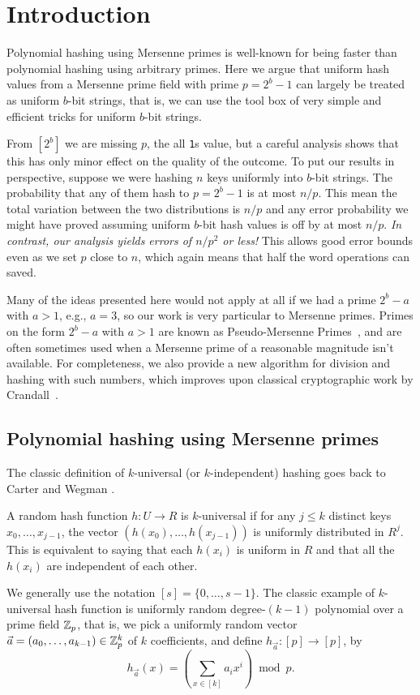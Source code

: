 \section{Introduction}
Polynomial hashing using Mersenne primes is well-known for being faster
than polynomial hashing using arbitrary primes. Here we argue that
uniform hash values from a Mersenne prime field with prime $p=2^b-1$
can largely be treated as uniform $b$-bit strings, that is, we can use
the tool box of very simple and efficient tricks for uniform
$b$-bit strings.

From $[2^b]$ we are missing $p$, the all \texttt1s value, but a careful analysis shows that this has only minor effect on the quality of the outcome.
To put our results in perspective, suppose we were hashing $n$ keys uniformly into $b$-bit strings.
The probability that any of them hash to $p=2^b-1$ is at most $n/p$.
This mean the total variation between the two distributions is $n/p$ and any error probability we might have proved assuming uniform $b$-bit hash values is off by at most $n/p$.
\emph{In contrast, our analysis yields errors of $n/p^2$ or less!}
This allows good error bounds even as we set $p$ close to $n$, which again means that half the word operations can saved.

Many of the ideas presented here would not apply at all if we had a prime $2^b-a$ with $a>1$, e.g., $a=3$, so our work is very particular to Mersenne primes.
Primes on the form $2^b-a$ with $a>1$ are known as Pseudo-Mersenne Primes~\cite{van2014encyclopedia}, and are often sometimes used when a Mersenne prime of a reasonable magnitude isn't available.
For completeness, we also provide a new algorithm for division and hashing with such numbers, which improves upon classical cryptographic work by Crandall~\cite{crandall1992method}.



\subsection{Polynomial hashing using Mersenne primes}
The classic definition of $k$-universal (or $k$-independent) hashing
goes back to Carter and Wegman \cite{wegman81kwise}.
\begin{definition}
   A random hash function $h:U\to R$ is $k$-universal if for any $j\leq k$
   distinct keys $x_0,\ldots,x_{j-1}$, the vector
   $(h(x_0),\ldots,h(x_{j-1}))$ is uniformly distributed in $R^j$. This
   is equivalent to saying that each $h(x_i)$ is uniform in $R$ and that
   all the $h(x_i)$ are independent of each other.
\end{definition}
We generally use the notation $[s]=\{0,\ldots,s-1\}$.
The classic example of $k$-universal
hash function is uniformly random degree-$(k-1)$ polynomial over a prime field
$\mathbb Z_p$, that is, we pick a uniformly random vector
$\vec a=(a_0,\ldots,a_{k-1})\in \mathbb Z_p^k$ of $k$ coefficients, and define
$h_{\vec a}:[p]\to[p]$, by 
\[h_{\vec a}(x)=\left(\sum_{x\in[k]}a_i x^i\right)\bmod p.\]

